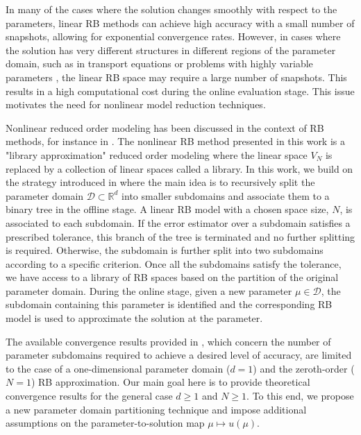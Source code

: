 \documentclass[12pt]{article}
\theoremstyle{remark}
\theoremstyle{definition}
\numberwithin{equation}{section}
\begin{document}
In many of the cases where the solution changes smoothly with respect to the parameters, linear RB methods can achieve high accuracy with a small number of snapshots, allowing for exponential convergence rates. However, in cases where the solution has very different structures in different regions of the parameter domain, such as in transport equations \cite{algoritmy} or problems with highly variable parameters \cite{eftang2010hp}, the linear RB space may require a large number of snapshots. This results in a high computational cost during the online evaluation stage. This issue motivates the need for nonlinear model reduction techniques.

Nonlinear reduced order modeling has been discussed in the context of RB methods, for instance in \cite{eftang2010hp,maday2013locally,zou2019adaptive,bonito2021nonlinear,cohen2022nonlinear}. The nonlinear RB method presented in this work is a "library approximation" reduced order modeling where the linear space $V_N$ is replaced by a collection of linear spaces called a library. In this work, we build on the strategy introduced in \cite{eftang2010hp} where the main idea is to recursively split the parameter domain $\mathcal{D} \subset \mathbb{R}^d$ into smaller subdomains and associate them to a binary tree in the offline stage. A linear RB model with a chosen space size, $N$, is associated to each subdomain. If the error estimator over a subdomain satisfies a prescribed tolerance, this branch of the tree is terminated and no further splitting is required. Otherwise, the subdomain is further split into two subdomains according to a specific criterion. Once all the subdomains satisfy the tolerance, we have access to a library of RB spaces based on the partition of the original parameter domain. During the online stage, given a new parameter $\mu \in \mathcal{D}$, the subdomain containing this parameter is identified and the corresponding RB model is used to approximate the solution at the parameter.

The available convergence results provided in \cite{eftang2010hp}, which concern the number of parameter subdomains required to achieve a desired level of accuracy, are limited to the case of a one-dimensional parameter domain ($d = 1$) and the zeroth-order ($N = 1$) RB approximation. Our main goal here is to provide theoretical convergence results for the general case $d \geq 1$ and $N \geq 1$. To this end, we propose a new parameter domain partitioning technique and impose additional assumptions on the parameter-to-solution map $\mu \mapsto u(\mu)$.
\end{document}
